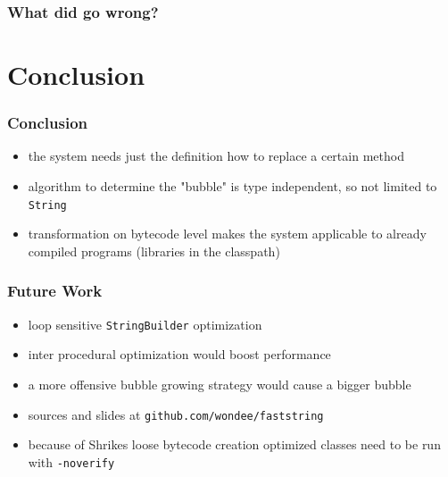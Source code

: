 \documentclass{beamer}
\begin{document}
\begin{frame}
	\frametitle{What did go wrong?}

\end{frame}

\section{Conclusion}

\frame{\sectionpage}

\begin{frame}
	\frametitle{Conclusion}
	\begin{itemize}
    \item the system needs just the definition how to replace a certain method
		\item algorithm to determine the "bubble" is type independent, so not limited to \texttt{String}
		\item transformation on bytecode level makes the system applicable to already compiled programs (libraries in the classpath) 
	\end{itemize}
\end{frame}

\begin{frame}
	\frametitle{Future Work}
  \begin{itemize}
    \item loop sensitive \texttt{StringBuilder} optimization 
    \item inter procedural optimization would boost performance 
    \item a more offensive bubble growing strategy would cause a bigger bubble
    \item sources and slides at \texttt{github.com/wondee/faststring}
    \item because of Shrikes loose bytecode creation optimized classes need to be run with \texttt{-noverify}
  \end{itemize}
\end{frame}
\end{document}
